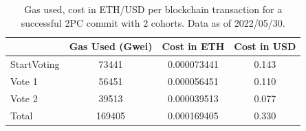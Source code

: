 \documentclass[11pt,sigplan,screen,nonacm]{acmart}
\begin{document}
\appendix
\label{appendix}
\begin{table}[hbtp]
  \centering
  \caption{Gas used, cost in ETH/USD per blockchain transaction for a successful 2PC commit with 2 cohorts. Data as of 2022/05/30.}
  \label{table:cost}
  \begin{tabular}{|l|c|c|c|}
    \hline
          & Gas Used (Gwei) &  Cost in ETH & Cost in USD \\
          \hline
    StartVoting &73441 &0.000073441 & 0.143\\
    \hline
    Vote 1 &56451	&0.000056451 &0.110\\
    \hline
    Vote 2 &39513 &0.000039513 &0.077\\
    \hline
    Total &169405 &0.000169405 &0.330\\
    \hline
  \end{tabular}
\end{table}
\end{document}

